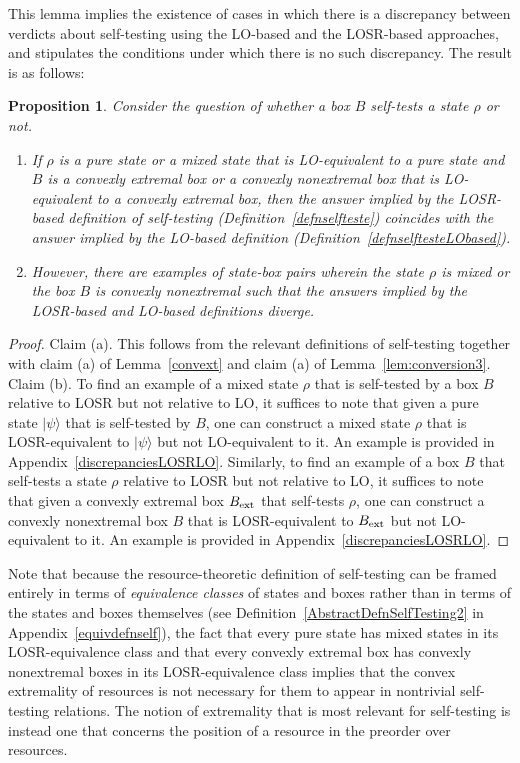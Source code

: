 \documentclass[prx,11pt,letterpaper,twocolumn,accepted=2023-11-27]{quantumarticle}
\theoremstyle{plain}
\newtheorem{prop}[theo]{Proposition}
\theoremstyle{definition}
\begin{document}
This lemma implies the existence of cases in which there is a discrepancy between verdicts about self-testing using the LO-based and the LOSR-based approaches, and stipulates the conditions under which there is no such discrepancy.  The result is as follows:
\begin{prop}\label{prop:agree}
Consider the question of whether a box $B$ self-tests a state $\rho$ or not. 
\begin{enumerate}
\item[(a)] If $\rho$ is a pure state or a mixed state that is LO-equivalent to a pure state and $B$ is a convexly extremal box or a convexly nonextremal box that is  
LO-equivalent to a convexly extremal box, then the answer implied by the  LOSR-based definition of self-testing (Definition~\ref{defnselfteste}) coincides with the answer implied  by the LO-based definition (Definition~\ref{defnselftesteLObased}).  
\item[(b)] However, there are examples of state-box pairs wherein the state $\rho$ is mixed or the box $B$ is convexly nonextremal  such that the answers implied by the LOSR-based and LO-based definitions diverge.
\end{enumerate}
\end{prop}


\begin{proof}  Claim (a).  This follows  from the relevant definitions of self-testing together with claim (a) of Lemma~\ref{convext} and claim (a) of Lemma~\ref{lem:conversion3}.  
Claim (b). To find an example of a mixed state $\rho$ that is self-tested by a box $B$ relative to LOSR but not relative to LO, it suffices to note that given a pure state $|\psi\rangle$ that is self-tested by $B$, one can construct a mixed state $\rho$ that is LOSR-equivalent to $|\psi\rangle$ but not LO-equivalent to it.  An example is provided in Appendix~\ref{discrepanciesLOSRLO}. Similarly, to find an example of a box $B$ that self-tests a state $\rho$  relative to LOSR but not relative to LO, it suffices to note that given a convexly extremal box $B_{\rm ext}$ that self-tests $\rho$, one can construct a convexly nonextremal box $B$ that is LOSR-equivalent to $B_{\rm ext}$ but not LO-equivalent to it.   An example is provided in Appendix~\ref{discrepanciesLOSRLO}.
\end{proof}


 
 
Note that because the resource-theoretic definition of self-testing can be framed entirely in terms of {\em equivalence classes} of states and boxes rather than in terms of the states and boxes themselves (see Definition~\ref{AbstractDefnSelfTesting2} in Appendix~\ref{equivdefnself}), the fact that every pure state has mixed states in its LOSR-equivalence class and that every convexly extremal box has convexly nonextremal boxes in its LOSR-equivalence class implies that the convex extremality of resources is not necessary for them to appear in nontrivial self-testing relations. 
The notion of extremality that is most relevant for self-testing is instead one that concerns the position of a resource in the preorder over resources.   
\end{document}
